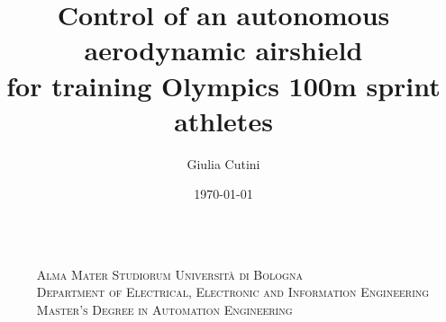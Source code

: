 \documentclass[9pt, aspectratio=169]{beamer}
\title[Control of an autonomous aerodynamic airshield for training Olympics 100m sprint athletes]
  {\Large Control of an autonomous aerodynamic airshield \\
for training Olympics 100m sprint athletes}
\author[Giulia Cutini]{Giulia Cutini}
\institute[University of Bologna]{}
\date{\today}
\begin{document}
\footnotesize


\begin{frame}

\begin{columns}
\begin{column}{0.15\textwidth}
\end{column}

\begin{column}{0.85\textwidth}
\centering
\fontsize{9}{11}\selectfont
\vspace{0.8cm}
\begin{columns}
\begin{column}{1.1\textwidth}
\centering \small
\textsc{Alma Mater Studiorum Universit\`{a} di Bologna}\\
\textsc{Department of Electrical, Electronic and Information Engineering}
\\
\vspace{0.1cm}
\textsc{Master's Degree in Automation Engineering}
\end{column}
\end{columns}


\end{column}
\end{columns}
\end{frame}
\end{document}
